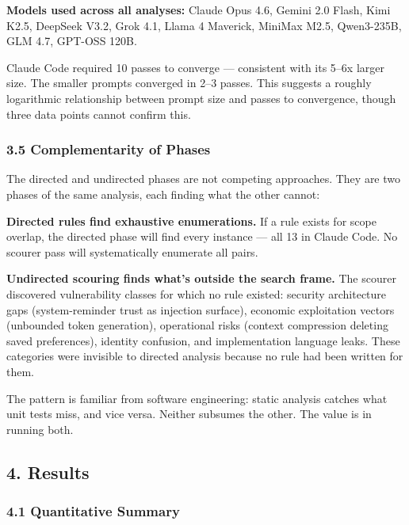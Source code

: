 \documentclass[
]{article}
\begin{document}
\textbf{Models used across all analyses:} Claude Opus 4.6, Gemini 2.0
Flash, Kimi K2.5, DeepSeek V3.2, Grok 4.1, Llama 4 Maverick, MiniMax
M2.5, Qwen3-235B, GLM 4.7, GPT-OSS 120B.

Claude Code required 10 passes to converge --- consistent with its 5--6x
larger size. The smaller prompts converged in 2--3 passes. This suggests
a roughly logarithmic relationship between prompt size and passes to
convergence, though three data points cannot confirm this.

\hypertarget{complementarity-of-phases}{%
\subsubsection{3.5 Complementarity of
Phases}\label{complementarity-of-phases}}

The directed and undirected phases are not competing approaches. They
are two phases of the same analysis, each finding what the other cannot:

\textbf{Directed rules find exhaustive enumerations.} If a rule exists
for scope overlap, the directed phase will find every instance --- all
13 in Claude Code. No scourer pass will systematically enumerate all
pairs.

\textbf{Undirected scouring finds what's outside the search frame.} The
scourer discovered vulnerability classes for which no rule existed:
security architecture gaps (system-reminder trust as injection surface),
economic exploitation vectors (unbounded token generation), operational
risks (context compression deleting saved preferences), identity
confusion, and implementation language leaks. These categories were
invisible to directed analysis because no rule had been written for
them.

The pattern is familiar from software engineering: static analysis
catches what unit tests miss, and vice versa. Neither subsumes the
other. The value is in running both.

\hypertarget{results}{%
\subsection{4. Results}\label{results}}

\hypertarget{quantitative-summary}{%
\subsubsection{4.1 Quantitative Summary}\label{quantitative-summary}}
\end{document}
